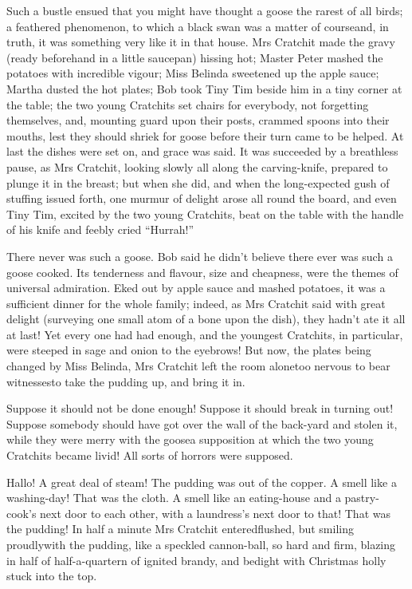 \documentclass[paper=5.5in:8.5in,BCOR=5mm,twoside,DIV=calc,12pt,usegeometry]{scrbook} %
\begin{document}
Such a bustle ensued that you might have thought a goose the rarest of all birds; a feathered phenomenon, to which a black swan was a matter of course\textemdash and, in truth, it was something very like it in that house. Mrs Cratchit made the gravy (ready beforehand in a little saucepan) hissing hot; Master Peter mashed the potatoes with incredible vigour; Miss Belinda sweetened up the apple sauce; Martha dusted the hot plates; Bob took Tiny Tim beside him in a tiny corner at the table; the two young Cratchits set chairs for everybody, not forgetting themselves, and, mounting guard upon their posts, crammed spoons into their mouths, lest they should shriek for goose before their turn came to be helped. At last the dishes were set on, and grace was said. It was succeeded by a breathless pause, as Mrs Cratchit, looking slowly all along the carving-knife, prepared to plunge it in the breast; but when she did, and when the long-expected gush of stuffing issued forth, one murmur of delight arose all round the board, and even Tiny Tim, excited by the two young Cratchits, beat on the table with the handle of his knife and feebly cried \enquote{Hurrah!}



There never was such a goose. Bob said he didn't believe there ever was such a goose cooked. Its tenderness and flavour, size and cheapness, were the themes of universal admiration. Eked out by apple sauce and mashed potatoes, it was a sufficient dinner for the whole family; indeed, as Mrs Cratchit said with great delight (surveying one small atom of a bone upon the dish), they hadn't ate it all at last! Yet every one had had enough, and the youngest Cratchits, in particular, were steeped in sage and onion to the eyebrows! But now, the plates being changed by Miss Belinda, Mrs Cratchit left the room alone\textemdash too nervous to bear witnesses\textemdash to take the pudding up, and bring it in.



Suppose it should not be done enough! Suppose it should break in turning out! Suppose somebody should have got over the wall of the back-yard and stolen it, while they were merry with the goose\textemdash a supposition at which the two young Cratchits became livid! All sorts of horrors were supposed.

Hallo! A great deal of steam! The pudding was out of the copper. A smell like a washing-day! That was the cloth. A smell like an eating-house and a pastry-cook's next door to each other, with a laundress's next door to that! That was the pudding! In half a minute Mrs Cratchit entered\textemdash flushed, but smiling proudly\textemdash with the pudding, like a speckled cannon-ball, so hard and firm, blazing in half of half-a-quartern of ignited brandy, and bedight with Christmas holly stuck into the top.
\end{document}
